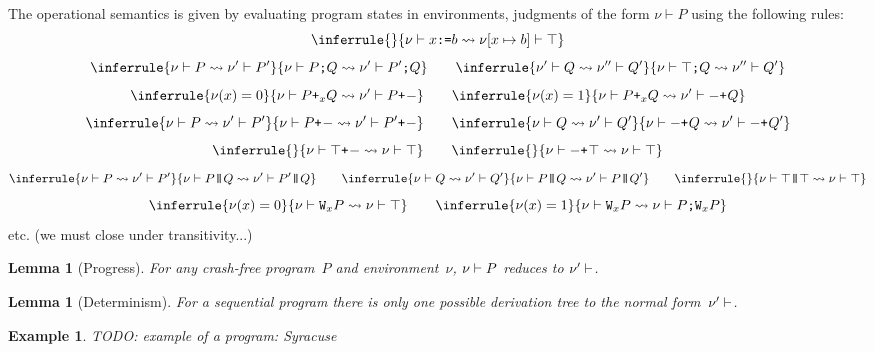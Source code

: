 \documentclass[a4paper]{article}
\theoremstyle{theorem}
\newtheorem{lemma}[theorem]{Lemma}
\theoremstyle{example}
\newtheorem{example}[theorem]{Example}
\theoremstyle{remark}
\begin{document}
The operational semantics is given by evaluating program states in environments,
\ie judgments of the form $\nu\vdash P$ using the following rules:
\[
  \inferrule{\null}{\penv{\nu}{\pset xb}\redto\penv{\nu[x\mapsto b]}{\pskip}}
\]
\[
  \inferrule{\penv\nu P\redto\penv{\nu'}{P'}}{\penv{\nu}{\pseq PQ}\redto\penv{\nu'}{\pseq{P'}{Q}}}
  \qquad
  \inferrule{\penv{\nu'}{Q}\redto\penv{\nu''}{Q'}}{\penv{\nu}{\pseq \pskip Q}\redto\penv{\nu''}{Q'}}
\]
\[
  \inferrule{\nu(x)=\Bfalse}{\penv{\nu}{\por xPQ}\redto\penv{\nu'}{\porl P}}
  \qquad
  \inferrule{\nu(x)=\Btrue}{\penv{\nu}{\por xPQ}\redto\penv{\nu'}{\porr Q}}
\]
\[
  \inferrule{\penv\nu P\redto\penv{\nu'}{P'}}{\penv{\nu}{\porl P}\redto\penv{\nu'}{\porl{P'}}}
  \qquad
  \inferrule{\penv\nu Q\redto\penv{\nu'}{Q'}}{\penv{\nu}{\porr Q}\redto\penv{\nu'}{\porr{Q'}}}
\]
\[
  \inferrule{\null}{\penv{\nu}{\porl\pskip}\redto\penv{\nu}{\pskip}}
  \qquad
  \inferrule{\null}{\penv{\nu}{\porr\pskip}\redto\penv{\nu}{\pskip}}
\]
\[
  \inferrule{\penv\nu P\redto\penv{\nu'}{P'}}{\penv{\nu}{\ppar PQ}\redto\penv{\nu'}{\ppar{P'}{Q}}}
  \qquad
  \inferrule{\penv\nu Q\redto\penv{\nu'}{Q'}}{\penv{\nu}{\ppar PQ}\redto\penv{\nu'}{\ppar{P}{Q'}}}
  \qquad
  \inferrule{\null}{\penv\nu{\ppar\pskip\pskip}\redto\penv\nu\pskip}
\]
\[
  \inferrule{\nu(x)=\Bfalse}{\penv\nu{\pwhile xP}\redto\penv\nu\pskip}
  \qquad
  \inferrule{\nu(x)=\Btrue}{\penv\nu{\pwhile xP}\redto\penv\nu{\pseq{P}{\pwhile xP}}}
\]
etc. (we must close under transitivity...)


\begin{lemma}[Progress]
  For any crash-free program~$P$ and environment~$\nu$, $\nu\vdash P$ reduces to
  $\nu'\vdash$.
\end{lemma}

\begin{lemma}[Determinism]
  For a sequential program there is only one possible derivation tree to the
  normal form~$\nu'\vdash$.
\end{lemma}

\begin{example}
  TODO: example of a program: Syracuse
\end{example}
\end{document}
